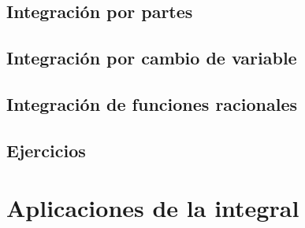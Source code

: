 \subsection{Integración por partes}
\subsection{Integración por cambio de variable}
\subsection{Integración de funciones racionales}
\subsection{Ejercicios}
\section{Aplicaciones de la integral}



